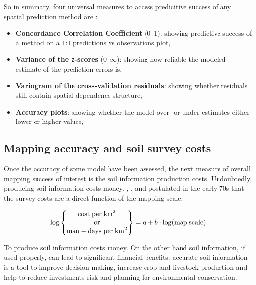 \documentclass[11pt]{krantz}
\providecommand{\tightlist}{%
  \setlength{\itemsep}{0pt}\setlength{\parskip}{0pt}}
\theoremstyle{definition}
\theoremstyle{definition}
\theoremstyle{definition}
\theoremstyle{remark}
\begin{document}
So in summary, four universal measures to access predicitive success of
any spatial prediction method are \citep{Hengl2018RFsp}:

\begin{itemize}
\tightlist
\item
  \textbf{Concordance Correlation Coefficient} (0--1): showing
  predictive success of a method on a 1:1 predictions vs observations
  plot,
\item
  \textbf{Variance of the z-scores} (0--\(\infty\)): showing how
  reliable the modeled estimate of the prediction errors is,
\item
  \textbf{Variogram of the cross-validation residuals}: showing whether
  residuals still contain spatial dependence structure,
\item
  \textbf{Accuracy plots}: showing whether the model over- or
  under-estimates either lower or higher values,
\end{itemize}

\hypertarget{mapping-accuracy-and-soil-survey-costs}{%
\subsection{Mapping accuracy and soil survey
costs}\label{mapping-accuracy-and-soil-survey-costs}}

Once the accuracy of some model have been assessed, the next measure of
overall mapping success of interest is the soil information production
costs. Undoubtedly, producing soil information costs money.
\citet{Burrough1971}, \citet{BieUlph1972JAE}, and \citet{Bie1973JSS}
postulated in the early 70s that the survey costs are a direct function
of the mapping scale:

\begin{equation}
\log \begin{Bmatrix}
{\rm cost} \; {\rm per} \; {\rm km}^2\\
{\rm or}\\
{\rm man-days} \; {\rm per} \; {\rm km}^2
\end{Bmatrix}
= a + b \cdot \log( {\rm map} \; {\rm scale} )
\label{eq:burrough}
\end{equation}

To produce soil information costs money. On the other hand soil
information, if used properly, can lead to significant financial
benefits: accurate soil information is a tool to improve decision
making, increase crop and livestock production and help to reduce
investments risk and planning for environmental conservation.
\end{document}
